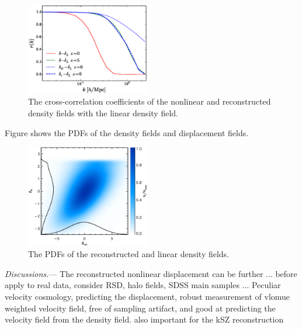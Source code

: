 \documentclass[aps,prd,twocolumn,showpacs,superscriptaddress,groupedaddress,nofootinbib]{revtex4}  %
\newcommand{\mr}{\mathrm}
\begin{document}
\begin{figure}[tbp]
\begin{center}
\includegraphics[width=0.48\textwidth]{fa.eps}
\end{center}
\vspace{-0.7cm}
\caption{The cross-correlation coefficients of the nonlinear and reconstructed 
density fields with the linear density field.}
\label{fig:xcc}
\end{figure}

Figure shows the PDFs of the density fields and displacement fields.

\begin{figure}[tbp]
\begin{center}
\includegraphics[width=0.48\textwidth]{pdf-1.eps}
\end{center}
\vspace{-0.7cm}
\caption{The PDFs of the reconstructed and linear density fields.}
\label{fig:pdf}
\end{figure}



{\it Discussions.}---
The reconstructed nonlinear displacement can be further ...
before apply to real data, consider RSD, halo fields, SDSS main samples ...
Peculiar velocity cosmology, predicting the displacement, robust measurement of
vlomue weighted velocity field, free of sampling artifact, and good at 
predicting the velocity field from the density field. also important for the
kSZ reconstruction
\end{document}
